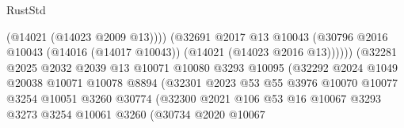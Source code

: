 \begin{lexlean}{RustStd}
\begin{coremodule}
                                              (@14021 (@14023 @2009 @13))))
                                          (@32691
                                            @2017
                                            @13
                                            @10043
                                            (@30796
                                              @2016
                                              @10043
                                              (@14016 (@14017 @10043))
                                              (@14021 (@14023 @2016 @13))))))
                                      (@32281
                                        @2025
                                        @2032
                                        @2039
                                        @13
                                        @10071
                                        @10080
                                        @3293
                                        @10095
                                        (@32292
                                          @2024
                                          @1049
                                          @20038
                                          @10071
                                          @10078
                                          @8894
                                          (@32301
                                            @2023
                                            @53
                                            @55
                                            @3976
                                            @10070
                                            @10077
                                            @3254
                                            @10051
                                            @3260
                                            @30774
                                            (@32300
                                              @2021
                                              @106
                                              @53
                                              @16
                                              @10067
                                              @3293
                                              @3273
                                              @3254
                                              @10061
                                              @3260
                                              (@30734
                                                @2020
                                                @10067

\end{coremodule}
\end{lexlean}
